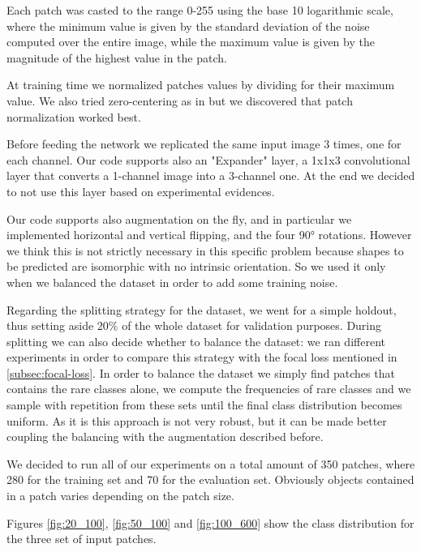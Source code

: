 \documentclass[a4paper,10pt]{report}
\begin{document}
Each patch was casted to the range 0-255 using the base 10 logarithmic scale, where the minimum value is given by the standard deviation of the noise computed over the entire image, while the maximum value is given by the magnitude of the highest value in the patch. 

At training time we normalized patches values by dividing for their maximum value. We also tried zero-centering as in \cite{claran} but we discovered that patch normalization worked best.

Before feeding the network we replicated the same input image 3 times, one for each channel. Our code supports also an "Expander" layer, a 1x1x3 convolutional layer that converts a 1-channel image into a 3-channel one. At the end we decided to not use this layer based on experimental evidences.

Our code supports also augmentation on the fly, and in particular we implemented horizontal and vertical flipping, and the four 90° rotations. However we think this is not strictly necessary in this specific problem because shapes to be predicted are isomorphic with no intrinsic orientation. So we used it only when we balanced the dataset in order to add some training noise.

Regarding the splitting strategy for the dataset, we went for a simple holdout, thus setting aside $20\%$ of the whole dataset for validation purposes. 
During splitting we can also decide whether to balance the dataset: we ran different experiments in order to compare this strategy with the focal loss mentioned in \ref{subsec:focal-loss}.
In order to balance the dataset we simply find patches that contains the rare classes alone, we compute the frequencies of rare classes and we sample with repetition from these sets until the final class distribution becomes uniform. As it is this approach is not very robust, but it can be made better coupling the balancing with the augmentation described before.

We decided to run all of our experiments on a total amount of 350 patches, where 280 for the training set and 70 for the evaluation set. Obviously objects contained in a patch varies depending on the patch size.

Figures \ref{fig:20_100}, \ref{fig:50_100} and \ref{fig:100_600} show the class distribution for the three set of input patches.
\end{document}
